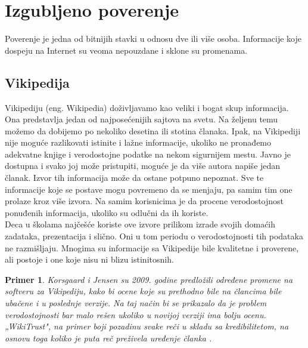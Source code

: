 \documentclass[a4paper]{article}
\newtheorem{primer}{Primer}[section]
\begin{document}
\section{Izgubljeno poverenje}

Poverenje je jedna od  bitnijih stavki u odnosu dve ili više osoba. Informacije koje dospeju na Internet su veoma nepouzdane i sklone su promenama.

\subsection{Vikipedija}
\label{subsec:podnaslovIP1}

Vikipediju (eng. Wikipedia) doživljavamo kao veliki i bogat skup informacija. Ona predstavlja jedan od najposećenijih sajtova na svetu. Na željenu temu možemo da dobijemo po nekoliko desetina ili stotina članaka. Ipak, na Vikipediji nije moguće razlikovati istinite i lažne informacije, ukoliko ne pronađemo adekvatne knjige i verodostojne podatke na nekom sigurnijem mestu. Javno je dostupna i svako joj može pristupiti, moguće je da više autora napiše jedan članak. Izvor tih informacija može da ostane potpuno nepoznat. Sve te informacije koje se postave mogu povremeno da se menjaju, pa samim tim one prolaze kroz više izvora. Na samim korisnicima je da procene verodostojnost ponuđenih informacija, ukoliko su odlučni da ih koriste. \\Deca u školama najčešće koriste ove izvore prilikom izrade svojih domaćih zadataka, prezentacija i slično. Oni u tom periodu o verodostojnosti tih podataka ne razmišljaju. Mnogima su informacije sa Vikipedije bile kvalitetne i proverene, ali postoje i one koje nisu ni blizu istinitosnih.
\begin{primer}
Korsgaard i Jensen su 2009. godine predložili određene promene na softveru za Vikipediju, kako bi ocene koje su prethodno bile na člancima bile ubačene i u poslednje verzije. Na taj način bi se prikazalo da je problem verodostojnosti bar malo rešen ukoliko u novijoj verziji ima bolju ocenu. „WikiTrust", na primer boji pozadinu svake reči u skladu sa kredibilitetom, na osnovu toga koliko je puta reč preživela uređenje članka \cite{tInOnl}.
\end{primer}
\end{document}
